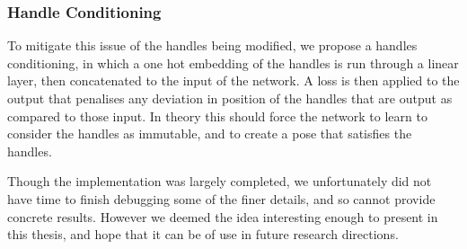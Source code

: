 

\subsubsection{Handle Conditioning}
To mitigate this issue of the handles being modified, we propose a handles conditioning, in which a one hot embedding of the handles is run through a linear layer, then concatenated to the input of the network. A loss is then applied to the output that penalises any deviation in position of the handles that are output as compared to those input. In theory this should force the network to learn to consider the handles as immutable, and to create a pose that satisfies the handles.

Though the implementation was largely completed, we unfortunately did not have time to finish debugging some of the finer details, and so cannot provide concrete results. However we deemed the idea interesting enough to present in this thesis, and hope that it can be of use in future research directions.
